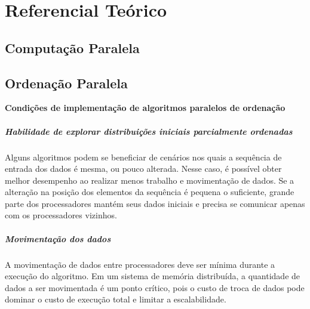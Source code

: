 \chapter{Referencial Teórico}

\section{Computação Paralela}

\section{Ordenação Paralela}



\textbf{Condições de implementação de algoritmos paralelos de ordenação}

\paragraph*{Habilidade de explorar distribuições iniciais parcialmente ordenadas}

Alguns algoritmos podem se beneficiar de cenários nos quais a sequência de entrada dos dados é mesma, ou pouco alterada. Nesse caso, é possível obter melhor desempenho ao realizar menos trabalho e movimentação de dados. 
Se a alteração na posição dos elementos da sequência é pequena o suficiente, grande parte dos processadores mantém seus dados iniciais e precisa se comunicar apenas com os processadores vizinhos.


\paragraph*{Movimentação dos dados}
A movimentação de dados entre processadores deve ser mínima durante a execução do algoritmo. Em um sistema de memória distribuída, a quantidade de dados a ser movimentada é um ponto crítico, pois o custo de troca de dados pode dominar o custo de execução total e limitar a escalabilidade.



